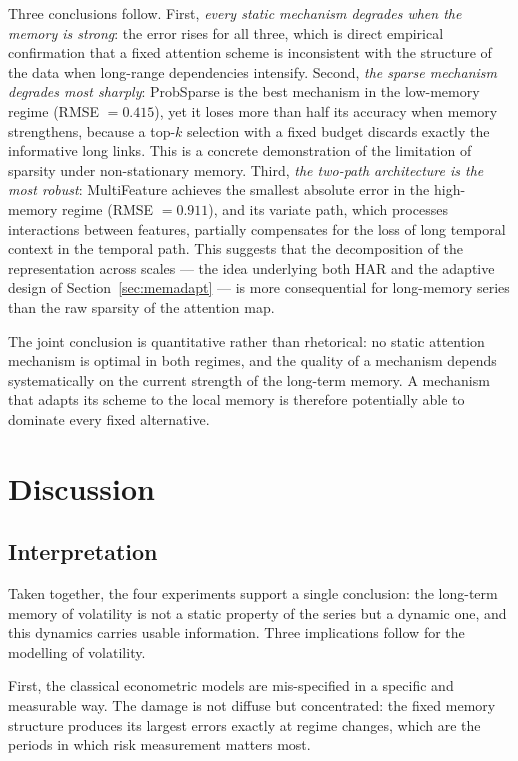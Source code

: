 \documentclass[journal]{IEEEtran}
\begin{document}
Three conclusions follow. First, \emph{every static mechanism degrades when the memory is
strong}: the error rises for all three, which is direct empirical confirmation that a fixed
attention scheme is inconsistent with the structure of the data when long-range dependencies
intensify. Second, \emph{the sparse mechanism degrades most sharply}: ProbSparse is the best
mechanism in the low-memory regime (RMSE $=0.415$), yet it loses more than half its accuracy when
memory strengthens, because a top-$k$ selection with a fixed budget discards exactly the
informative long links. This is a concrete demonstration of the limitation of sparsity under
non-stationary memory. Third, \emph{the two-path architecture is the most robust}: MultiFeature
achieves the smallest absolute error in the high-memory regime (RMSE $=0.911$), and its variate
path, which processes interactions between features, partially compensates for the loss of long
temporal context in the temporal path. This suggests that the decomposition of the representation
across scales --- the idea underlying both HAR and the adaptive design of
Section~\ref{sec:memadapt} --- is more consequential for long-memory series than the raw
sparsity of the attention map.

The joint conclusion is quantitative rather than rhetorical: no static attention mechanism is
optimal in both regimes, and the quality of a mechanism depends systematically on the current
strength of the long-term memory. A mechanism that adapts its scheme to the local memory is
therefore potentially able to dominate every fixed alternative.

\section{Discussion}\label{sec:discussion}

\subsection{Interpretation}

Taken together, the four experiments support a single conclusion: the long-term memory of
volatility is not a static property of the series but a dynamic one, and this dynamics carries
usable information. Three implications follow for the modelling of volatility.

First, the classical econometric models are mis-specified in a specific and measurable way. The
damage is not diffuse but concentrated: the fixed memory structure produces its largest errors
exactly at regime changes, which are the periods in which risk measurement matters most.
\end{document}
